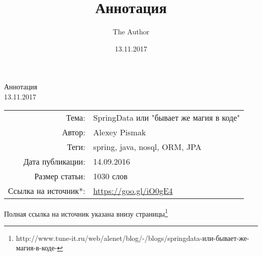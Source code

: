 \documentclass[12pt]{article}
\title{Аннотация}
\author{The Author}
\date{13.11.2017}
\begin{document}
	\begin{center}
		{\LARGE Аннотация}\\13.11.2017
	\end{center}
	\par
	\large
	\begin{tabular}{rl}
		Тема:&SpringData или "бывает же магия в коде"\\
    		Автор:&Alexey Pismak\\
		Теги:&spring, java, nosql, ORM, JPA \\
   	 	Дата публикации:& 14.09.2016\\
   	 	Размер статьи:&1030 слов\\
		Ссылка на источник*:& \url{https://goo.gl/iO0gE4}
	\end{tabular}
	
	\par
	{\small*Полная ссылка на источник указана внизу страницы\footnote{\label{full_link} http://www.tune-it.ru/web/alenet/blog/-/blogs/springdata-или-бывает-же-магия-в-коде-}}
	\\
	\vspace{0.3in}
\end{document}
